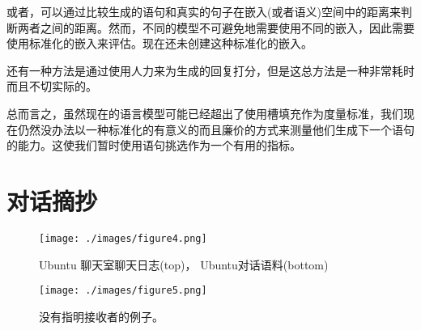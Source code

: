 \documentclass{article}
\begin{document}
\begin{multicols}{2}
	或者，可以通过比较生成的语句和真实的句子在嵌入(或者语义)空间中的距离来判断两者之间的距离。然而，不同的模型不可避免地需要使用不同的嵌入，因此需要使用标准化的嵌入来评估。现在还未创建这种标准化的嵌入。
	
	还有一种方法是通过使用人力来为生成的回复打分，但是这总方法是一种非常耗时而且不切实际的。
	
	总而言之，虽然现在的语言模型可能已经超出了使用槽填充作为度量标准，我们现在仍然没办法以一种标准化的有意义的而且廉价的方式来测量他们生成下一个语句的能力。这使我们暂时使用语句挑选作为一个有用的指标。
	
		
	\end{multicols}
	 
	
	\newpage
	\appendix
	\appendixpage
	\section{对话摘抄}

	\begin{figure}[H]
		\centering
		\texttt{[image: ./images/figure4.png]}
		\caption{Ubuntu 聊天室聊天日志(top)， Ubuntu对话语料(bottom)}
		\label{Ubuntu聊天日志转聊天语料}
	\end{figure}
	
	\begin{figure}[H]
		\centering
		\texttt{[image: ./images/figure5.png]}
		\caption{没有指明接收者的例子。}
		\label{没有指明接收者}
	\end{figure}
	
	
	
\end{document}
